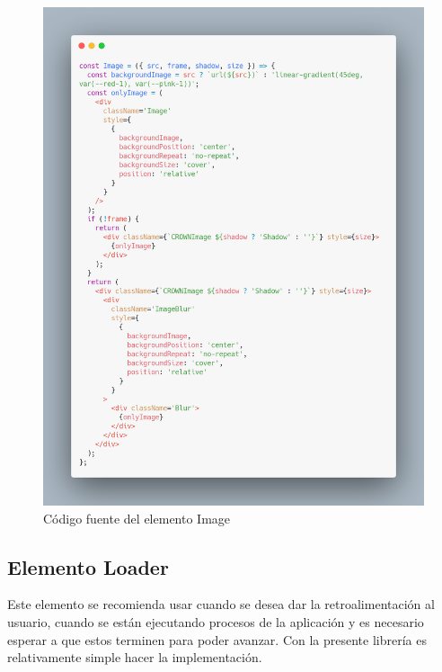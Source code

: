     \begin{figure}[H]
    \centering
    \includegraphics[width=1\textwidth]{./Imagenes/8.35.png}
    \caption[Código fuente del elemento Image]{Código fuente del elemento Image}
    \end{figure}
   \clearpage
   
    
    
    \subsection{Elemento Loader}
Este elemento se recomienda usar cuando se desea dar la retroalimentación al usuario, cuando se están ejecutando procesos de la aplicación y es necesario esperar a que estos terminen para poder avanzar.
Con la presente librería es relativamente simple hacer la implementación.

